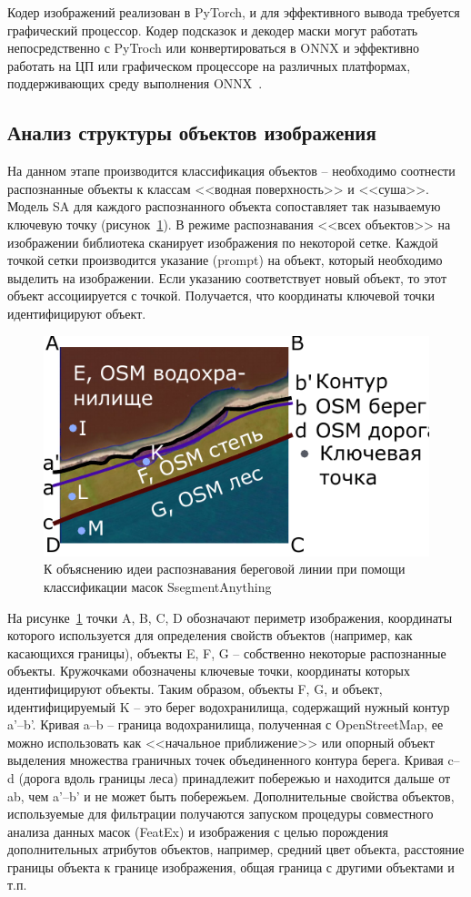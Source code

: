 \documentclass[732,14pt,final]{studrep}
\begin{document}
Кодер изображений реализован в PyTorch, и для эффективного вывода требуется графический процессор. Кодер подсказок и декодер маски могут работать непосредственно с PyTroch или конвертироваться в ONNX и эффективно работать на ЦП или графическом процессоре на различных платформах, поддерживающих среду выполнения ONNX~\cite{samart}.

\subsection{Анализ структуры объектов изображения}

На данном этапе производится классификация объектов -- необходимо соотнести распознанные объекты к классам <<водная поверхность>> и <<суша>>. Модель SA для каждого распознанного объекта сопоставляет так называемую ключевую точку (рисунок~\ref{fig:objsanalysis}). В режиме распознавания <<всех объектов>> на изображении библиотека сканирует изображения по некоторой сетке. Каждой точкой сетки производится указание (prompt) на объект, который необходимо выделить на изображении. Если указанию соответствует новый объект, то этот объект ассоциируется с точкой. Получается, что координаты ключевой точки идентифицируют объект.

\begin{figure}
  \centering
  \includegraphics[width=0.7\linewidth]{pics/tracing-p.pdf}
  \caption{К объяснению идеи распознавания береговой линии при помощи классификации масок SsegmentAnything}\label{fig:objsanalysis}
\end{figure}

На рисунке~\ref{fig:objsanalysis} точки A, B, C, D обозначают периметр изображения, координаты которого используется для определения свойств объектов (например, как касающихся границы), объекты E, F, G -- собственно некоторые распознанные объекты. Кружочками обозначены ключевые точки, координаты которых идентифицируют объекты. Таким образом, объекты F, G, и объект, идентифицируемый K -- это берег водохранилища, содержащий нужный контур a’--b’. Кривая a--b -- граница водохранилища, полученная с OpenStreetMap, ее можно использовать как <<начальное приближение>> или опорный объект выделения множества граничных точек объединенного контура берега. Кривая c--d (дорога вдоль границы леса) принадлежит побережью и находится дальше от ab, чем a’--b’ и не может быть побережьем. Дополнительные свойства объектов, используемые для фильтрации получаются запуском процедуры совместного анализа данных масок (FeatEx) и изображения с целью порождения дополнительных атрибутов объектов, например, средний цвет объекта, расстояние границы объекта к границе изображения, общая граница с другими объектами и т.п.
\end{document}
